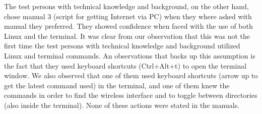 The test persons with technical knowledge and background, on the other hand, chose manual 3 (script for getting Internet via PC) when they where asked with manual they preferred. They showed confidence when faced with the use of both Linux and the terminal. It was clear from our observation that this was not the first time the test persons with technical knowledge and background utilized Linux and terminal commands. An observations that backs up this assumption is the fact that they used keyboard shortcuts (Ctrl+Alt+t) to open the terminal window. We also observed that one of them used keyboard shortcuts (arrow up to get the latest command used) in the terminal, and one of them knew the commands in order to find the wireless interface and to toggle between directories (also inside the terminal). None of these actions were stated in the manuals.  

